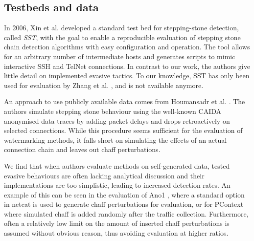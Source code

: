 \documentclass[runningheads,11pt]{llncs}\usepackage[]{graphicx}\usepackage[]{color}
\begin{document}
\subsection{Testbeds and data}

In 2006, Xin et al. \cite{xin2006testbed} developed a standard test bed for stepping-stone detection, called \textit{SST}, with the goal to enable a reproducible evaluation of stepping stone chain detection algorithms with easy configuration and operation. The tool allows for an arbitrary number of intermediate hosts and generates scripts to mimic interactive SSH and TelNet connections. 
In contrast to our work, the authors give little detail on implemented evasive tactics.
To our knowledge, SST has only been used for evaluation by Zhang et al. \cite{zhang2005stepping}, and is not available anymore. %

An approach to use publicly available data comes from Houmansadr et al. \cite{nasr2018deepcorr}. The authors simulate stepping stone behaviour using the well-known CAIDA anonymised data traces \cite{CAIDA2018} by adding packet delays and drops retroactively on selected connections.
While this procedure seems sufficient for the evaluation of watermarking methods, it falls short on simulating the effects of an actual connection chain and leaves out chaff perturbations. 

We find that when authors evaluate methods on self-generated data, tested evasive behaviours are often lacking analytical discussion and their implementations are too simplistic, leading to increased detection rates. An example of this can be seen in the evaluation of Ano1 \cite{di2011detecting}, where a standard option in netcat is used to generate chaff perturbations for evaluation, or for PContext \cite{yang2015rtt} where simulated chaff is added randomly after the traffic collection.%
Furthermore, often a relatively low limit on the amount of inserted chaff perturbations is assumed without obvious reason, thus avoiding evaluation at higher ratios. %
\end{document}
